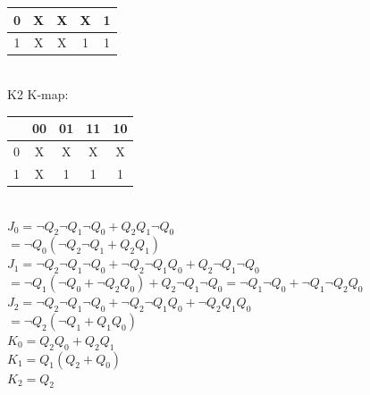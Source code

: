 \documentclass{article}
\begin{document}
{\begin{tabular}{|c|c|c|c|c|}
        \hline
        0 & X  & X  & X  & 1  \\
        \hline
        1 & X  & X  & 1  & 1  \\
        \hline
    \end{tabular} \\
    \linebreak
    K2 K-map: \\
    \begin{tabular}{|c|c|c|c|c|}
        \hline
          & 00 & 01 & 11 & 10 \\
        \hline
        0 & X  & X  & X  & X  \\
        \hline
        1 & X  & 1  & 1  & 1  \\
        \hline
    \end{tabular} \\
    $J_0 = \neg Q_2 \neg Q_1 \neg Q_0 + Q_2 Q_1 \neg Q_0$                                                      \\
    $= \neg Q_0 (\neg Q_2 \neg Q_1 + Q_2 Q_1)$                                                                 \\
    $J_1 = \neg Q_2 \neg Q_1 \neg Q_0 + \neg Q_2 \neg Q_1 Q_0 + Q_2 \neg Q_1 \neg Q_0$                         \\
    $= \neg Q_1 (\neg Q_0 + \neg Q_2 Q_0) + Q_2 \neg Q_1 \neg Q_0 = \neg Q_1 \neg Q_0 + \neg Q_1 \neg Q_2 Q_0$ \\
    $J_2 = \neg Q_2 \neg Q_1 \neg Q_0 + \neg Q_2 \neg Q_1 Q_0 + \neg Q_2 Q_1 Q_0$                              \\
    $= \neg Q_2(\neg Q_1 + Q_1 Q_0)$                                                                           \\
    $K_0 = Q_2 Q_0 + Q_2 Q_1$                                                                                  \\
    $K_1 = Q_1 (Q_2 + Q_0)$                                                                                    \\
    $K_2 = Q_2$                                                                                                \\
}
\end{document}
